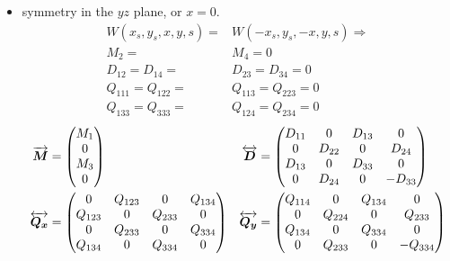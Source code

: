 \documentclass[
	12pt,				%
	openright,			%
	oneside,			%
	a4paper,		%
	chapter=TITLE,		%
	section=TITLE,		%
    brazil,				%
	english,			%
	sumario=tradicional,
	]{abntex2}
\begin{document}
\begin{apendicesenv}
\begin{itemize}
\item symmetry in the $yz$ plane, or $x=0$.
\begin{align}
W(x_s,y_s,x,y,s) = & W(-x_s,y_s,-x,y,s) \Rightarrow \\
M_2= & M_4=0\\
D_{12}=D_{14}= & D_{23}=D_{34}=0\\
Q_{111}=Q_{122}= & Q_{113}=Q_{223}=0\\
Q_{133}=Q_{333}= & Q_{124}=Q_{234}=0
\end{align}
\begin{align}
\overrightarrow{\boldsymbol{M}}&= \begin{pmatrix} M_{1}\\ 0\\ M_{3}\\ 0\end{pmatrix} &
\overleftrightarrow{\boldsymbol{D}} &= \begin{pmatrix} D_{11} &    0   & D_{13} &    0    \\
                                  0   & D_{22} &    0   &  D_{24} \\
                               D_{13} &    0   & D_{33} &    0    \\
                                  0   & D_{24} &    0   & -D_{33}
               \end{pmatrix}\\
\overleftrightarrow{\boldsymbol{Q_x}}&=\begin{pmatrix}    0    & Q_{123} &    0    & Q_{134} \\
                               Q_{123} &    0    & Q_{233} &    0    \\
                                  0    & Q_{233} &    0    & Q_{334} \\
                               Q_{134} &    0    & Q_{334} &    0
               \end{pmatrix} &
\overleftrightarrow{\boldsymbol{Q_y}}&=\begin{pmatrix} Q_{114} &    0    & Q_{134} &    0    \\
                                  0    & Q_{224} &    0    & Q_{233} \\
                               Q_{134} &    0    & Q_{334} &    0    \\
                                  0    & Q_{233} &    0    & -Q_{334}
               \end{pmatrix}
\end{align}


\end{itemize}
\end{apendicesenv}
\end{document}
